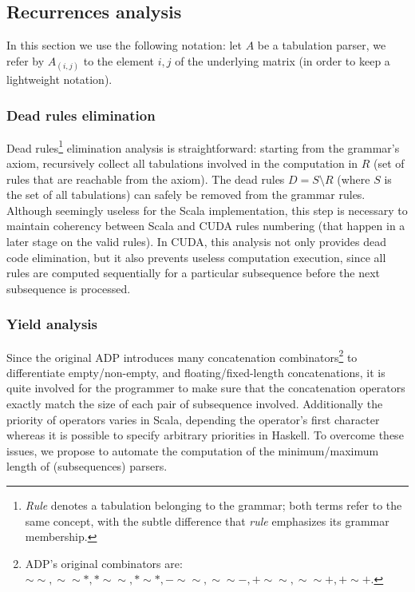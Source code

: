 \subsection{Recurrences analysis} \label{recurrences}
In this section we use the following notation: let $A$ be a tabulation parser, we refer by $A_{(i,j)}$ to the element $i,j$ of the underlying matrix (in order to keep a lightweight notation).
\subsubsection{Dead rules elimination} \label{dead_rules}
Dead rules\footnote{\textit{Rule} denotes a tabulation belonging to the grammar; both terms refer to the same concept, with the subtle difference that \textit{rule} emphasizes its grammar membership.} elimination analysis is straightforward: starting from the grammar's axiom, recursively collect all tabulations involved in the computation in $R$ (set of rules that are reachable from the axiom). The dead rules $D=S \setminus R$ (where $S$ is the set of all tabulations) can safely be removed from the grammar rules. Although seemingly useless for the Scala implementation, this step is necessary to maintain coherency between Scala and CUDA rules numbering (that happen in a later stage on the valid rules). In CUDA, this analysis not only provides dead code elimination, but it also prevents useless computation execution, since all rules are computed sequentially for a particular subsequence before the next subsequence is processed.

\subsubsection{Yield analysis} \label{yield_analysis}
Since the original ADP introduces many concatenation combinators\footnote{ADP's original combinators are: $\sim\sim, \sim\sim*, *\sim\sim, *\sim*, -\sim\sim, \sim\sim-, +\sim\sim, \sim\sim+, +\sim+$.} to differentiate empty/non-empty, and floating/fixed-length concatenations, it is quite involved for the programmer to make sure that the concatenation operators exactly match the size of each pair of subsequence involved. Additionally the priority of operators varies in Scala, depending the operator's first character whereas it is possible to specify arbitrary priorities in Haskell. To overcome these issues, we propose to automate the computation of the minimum/maximum length of (subsequences) parsers.

